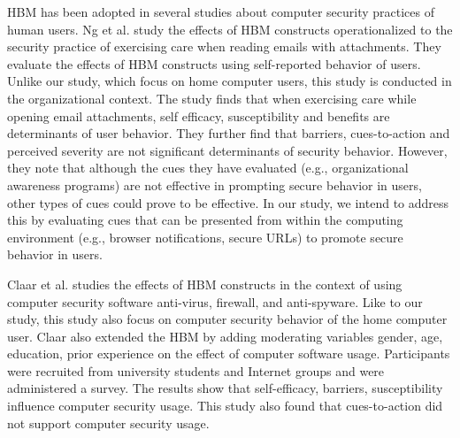 HBM has been adopted in several studies about computer security practices of human users. Ng et al. \citeyear{ng2007} study the effects of HBM constructs operationalized to the security practice of exercising care when reading emails with attachments. They evaluate the effects of HBM constructs using self-reported behavior of users. Unlike our study, which focus on home computer users, this study is conducted in the organizational context. The study finds that when exercising care while opening email attachments, self efficacy, susceptibility and benefits are determinants of user behavior. They further find that barriers, cues-to-action and perceived severity are not significant determinants of security behavior. However, they note that although the cues they have evaluated (e.g., organizational awareness programs) are not effective in prompting secure behavior in users, other types of cues could prove to be effective. In our study, we intend to address this by evaluating cues that can be presented from within the computing environment (e.g., browser notifications, secure URLs) to promote secure behavior in users.

Claar et al. \citeyear{claar2010} studies the effects of HBM constructs in the context of using computer security software anti-virus, firewall, and  anti-spyware. Like to our study, this study also focus on computer security behavior of the home computer user. Claar also extended the HBM by adding moderating variables gender, age, education, prior experience on the effect of computer software usage. Participants were recruited from university students and Internet groups and were administered a survey. The results show that self-efficacy, barriers, susceptibility influence computer security usage. This study also found that cues-to-action did not support computer security usage.

